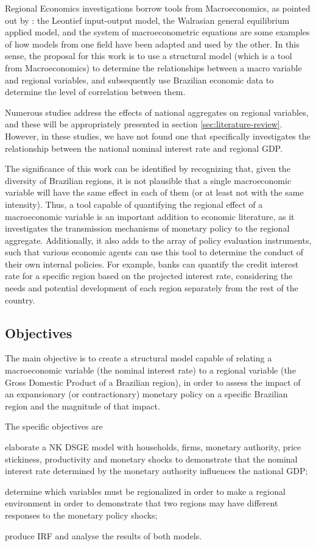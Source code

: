 \documentclass[
thesis.tex
]{subfiles}
\begin{document}
	Regional Economics investigations borrow tools from Macroeconomics, as pointed out by \textcite{rickman_modern_2010}: the Leontief input-output model, the Walrasian general equilibrium applied model, and the system of macroeconometric equations are some examples of how models from one field have been adapted and used by the other. In this sense, the proposal for this work is to use a structural model (which is a tool from Macroeconomics) to determine the relationships between a macro variable and regional variables, and subsequently use Brazilian economic data to determine the level of correlation between them.
	
	Numerous studies address the effects of national aggregates on regional variables, and these will be appropriately presented in section \ref{sec:literature-review}. However, in these studies, we have not found one that specifically investigates the relationship between the national nominal interest rate and regional GDP.
	
	The significance of this work can be identified by recognizing that, given the diversity of Brazilian regions, it is not plausible that a single macroeconomic variable will have the same effect in each of them (or at least not with the same intensity). Thus, a tool capable of quantifying the regional effect of a macroeconomic variable is an important addition to economic literature, as it investigates the transmission mechanisms of monetary policy to the regional aggregate. Additionally, it also adds to the array of policy evaluation instruments, such that various economic agents can use this tool to determine the conduct of their own internal policies. For example, banks can quantify the credit interest rate for a specific region based on the projected interest rate, considering the needs and potential development of each region separately from the rest of the country.
	
	\subsection*{Objectives}
	
	The main objective is to create a structural model capable of relating a macroeconomic variable (the nominal interest rate) to a regional variable (the Gross Domestic Product of a Brazilian region), in order to assess the impact of an expansionary (or contractionary) monetary policy on a specific Brazilian region and the magnitude of that impact.
	
	The specific objectives are 
	\begin{enumerate*}[label=(\arabic*)]
		\item elaborate a NK DSGE model with households, firms, monetary authority, price stickiness, productivity and monetary shocks to demonstrate that the nominal interest rate determined by the monetary authority influences the national GDP; 
		\item determine which variables must be regionalized in order to make a regional environment in order to demonstrate that two regions may have different responses to the monetary policy shocks; 
		\item produce IRF and analyse the results of both models.
	\end{enumerate*}	
\end{document}
